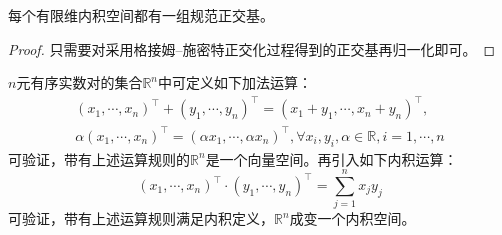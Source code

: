 \documentclass[main.tex]{subfiles}
\begin{document}
\begin{corollary}
    每个有限维内积空间都有一组规范正交基。
\end{corollary}
\begin{proof}
只需要对采用格接姆--施密特正交化过程得到的正交基再归一化即可。
\end{proof}

\begin{example}
$n$元有序实数对的集合$\mathbb{R}^n$中可定义如下加法运算：
\begin{align*}
\left(x_1,\cdots,x_n\right)^\intercal+\left(y_1,\cdots,y_n\right)^\intercal=\left(x_1+y_1,\cdots,x_n+y_n\right)^\intercal,\\
\alpha\left(x_1,\cdots,x_n\right)^\intercal=\left(\alpha x_1,\cdots,\alpha x_n\right)^\intercal,\forall x_i,y_i,\alpha\in\mathbb{R},i=1,\cdots,n
\end{align*}
可验证，带有上述运算规则的$\mathbb{R}^n$是一个向量空间。再引入如下内积运算：
\[
\left(x_1,\cdots,x_n\right)^\intercal\cdot\left(y_1,\cdots,y_n\right)^\intercal=\sum_{j=1}^nx_jy_j\]
可验证，带有上述运算规则满足内积定义，$\mathbb{R}^n$成变一个内积空间。
\end{example}
\end{document}
